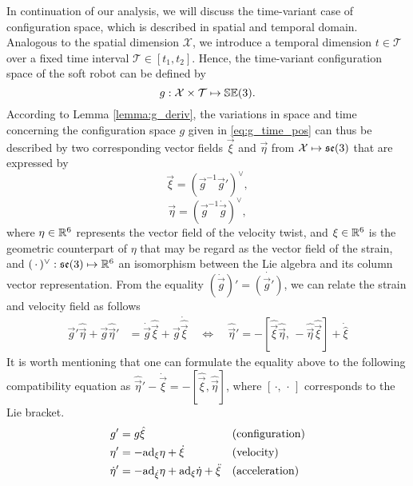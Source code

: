 In continuation of our analysis, we will discuss the time-variant case of configuration space, which is described in spatial and temporal domain. Analogous to the spatial dimension $\mathcal{X}$, we introduce a temporal dimension $t \in \mathcal{T}$ over a fixed time interval $\mathcal{T} \in [t_1, t_2]$. Hence, the time-variant configuration space of the soft robot can be defined by 
\begin{equation}
g: \mathcal{X} \times \mathcal{T} \mapsto {\mathbb{SE}(3)}.
\label{eq:g_time_pos}
\end{equation}
According to Lemma \ref{lemma:g_deriv}, the variations in space and time concerning the configuration space $g$ given in \eqref{eq:g_time_pos} can thus be described by two corresponding vector fields $\vec{\xi}$ and $\vec{\eta}$ from $\mathcal{X} \mapsto {\mathfrak{se}(3)}$ that are expressed by
\begin{equation}
{\vec{\xi}} = \left( \vec{g}^{-1} \vec{g}'\right)^\vee,
\end{equation}
\begin{equation}
{\vec{\eta}} = \left( \vec{g}^{-1} \dot{\vec{g}}\right)^\vee,
\end{equation}
where $\eta \in \mathbb{R}^6$ represents the vector field of the velocity twist, and $\xi  \in \mathbb{R}^6$ is the geometric counterpart of $\eta$ that may be regard as the vector field of the strain, and $(\,\cdot\,)^\vee: {\mathfrak{se}(3)} \mapsto \mathbb{R}^6$ an isomorphism between the Lie algebra and its column vector representation. From the equality $\left(\dot{\vec{g}} \right)' = \dot{\left( \vec{g}' \right)}$, we can relate the strain and velocity field as follows
\begin{align}
\vec{g}' \hat{\vec{\eta}} + \vec{g} \hat{\vec{\eta}}' & =  \dot{\vec{g}} \hat{\vec{\xi}} + \vec{g} \dot{\hat{\vec{\xi}}} \quad \Longleftrightarrow \quad
\hat{\vec{\eta}}' = -\left[\hat{\vec{\xi}}\hat{\vec{\eta}},\, - \hat{\vec{\eta}}\hat{\vec{\xi}}\right] + \dot{\hat{\xi}} 
\end{align}
It is worth mentioning that one can formulate the equality above to the following compatibility equation as $\hat{\vec{\eta}}' - \dot{\vec{\xi}} = - [\hat{\vec{\xi}},\hat{\vec{\eta}}]$, where $[\,\cdot,\,\cdot\,]$ corresponds to the Lie bracket. 
\begin{align}
{g}' & = {g} \hat{{\xi}} & &  \text{(configuration)}\\
{\eta}' & = -\text{ad}_{\xi} {\eta} + \dot{{\xi}} & & \text{(velocity)}\\
\dot{{\eta}}' & = -\text{ad}_{\dot{{\xi}}} {\eta} + \text{ad}_{\xi} \dot{{\eta}} + \ddot{{\xi}} & & \text{(acceleration)}
\end{align}
